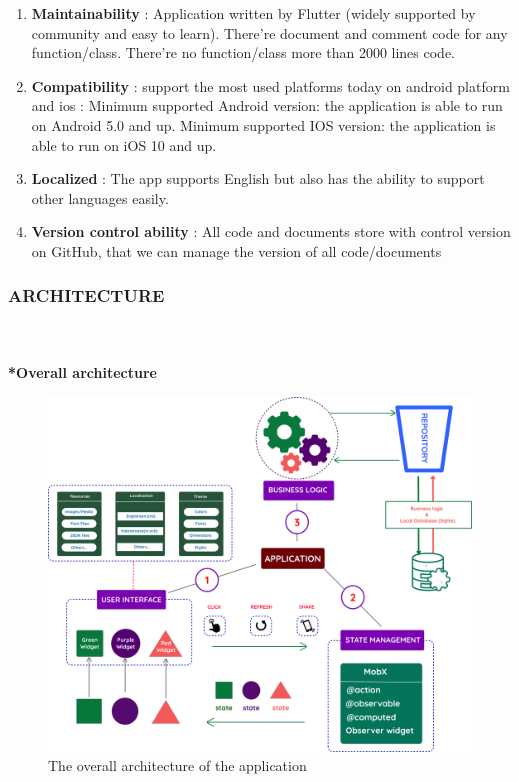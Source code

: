 \documentclass{article}
\begin{document}
\begin{enumerate}
        \item \textbf{Maintainability} : Application written by Flutter (widely supported by community and easy to learn). There’re document and comment code for any function/class. There’re no function/class more than 2000 lines code. 
        \item \textbf{Compatibility} : support the most used platforms today on android platform and ios :  Minimum supported Android version: the application is able to run on Android 5.0 and up.  Minimum supported IOS version: the application is able to run on iOS 10 and up. 
        \item \textbf{Localized} : The app supports English but also has the ability to support other languages easily. 
        \item \textbf{Version control ability} : All code and documents store with control version on GitHub, that we can manage the version of all code/documents 
    \end{enumerate}
\newpage
\subsubsection{ARCHITECTURE}  \\ \\ 
\textbf{*Overall architecture} \\
\begin{figure}[h!]
    \centering
    \includegraphics[scale=0.11]{Images/app-architecture.png}
    \caption{The overall architecture of the application}
    \label{fig:cookingbook}
\end{figure}
\end{document}
